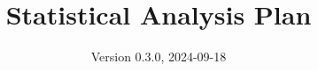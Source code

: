 \documentclass[
]{scrartcl}
\title{Statistical Analysis Plan}
\subtitle{ADVANCE TRAUMA\\
\strut \\
Effects of Advanced Trauma Life Support\textsuperscript{®} Training
Compared to Standard Care on Adult Trauma Patient Outcomes: A Cluster
Randomised Trial}
\author{Version 0.3.0, 2024-09-18}
\date{}
\begin{document}


\begin{titlepage}


\newcommand{\titlepagepagealign}{
\ifthenelse{\equal{center}{right}}{\raggedleft}{}
\ifthenelse{\equal{center}{center}}{\centering}{}
\ifthenelse{\equal{center}{left}}{\raggedright}{}
}


\newcommand{\titleandsubtitle}{
{\fontsize{15}{18.0}\selectfont
{\uppercase{\nohyphens{Statistical Analysis Plan}}}\par
}%

\vspace{\betweentitlesubtitle}
{
\fontsize{20}{24.0}\selectfont
{\bfseries{\nohyphens{ADVANCE TRAUMA\\
\strut \\
Effects of Advanced Trauma Life Support\textsuperscript{®} Training
Compared to Standard Care on Adult Trauma Patient Outcomes: A Cluster
Randomised Trial}}}\par
}}
\newcommand{\titlepagetitleblock}{
\rule{\textwidth}{0.4pt} %
\vspace{0.025\textheight} %

\titleandsubtitle

\vspace{0.025\textheight} 
\rule{0.3\textwidth}{0.4pt} %
}
\newcommand{\authorstyle}[1]{{\Large{#1}}}

\newcommand{\affiliationstyle}[1]{{\large{#1}}}

\newcommand{\titlepageauthorblock}{
{\authorstyle{\nohyphens{Version 0.3.0, 2024-09-18}\\}}
}

\newcommand{\titlepageaffiliationblock}{
\hangindent=1em
\hangafter=1
{\affiliationstyle{


\vspace{1\baselineskip} 
}}
}
\newcommand{\headerstyled}{%
{}
}
\newcommand{\footerstyled}{%
{\large{\textsc{}}}
}
\newcommand{\datestyled}{%
{}
}


\newcommand{\titlepageheaderblock}{\headerstyled}

\newcommand{\titlepagefooterblock}{
\footerstyled
}

\newcommand{\titlepagedateblock}{
\datestyled
}

\newcommand{\titleblock}{\newlength{\betweentitlesubtitle}
\setlength{\betweentitlesubtitle}{\baselineskip}
{

}}
\end{titlepage}
\end{document}
